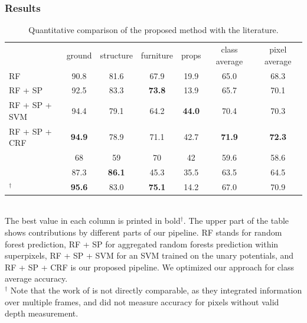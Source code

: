 \documentclass[final,ignorenonframetext,compress]{beamer}
\begin{document}
    \begin{frame}
        \frametitle{Results}
        \begin{table}[t]
            \caption{Quantitative comparison of the proposed method with the
            literature.}
        \begin{tabularx}{\linewidth}{@{\extracolsep{\fill}}lcccccc}
        \toprule
                                & ground        &  structure    & furniture     & props         & class average   & pixel average\\
        \cmidrule(r){1-7}

        RF                              &         90.8  &   81.6        & 67.9          & 19.9          &  65.0        &  68.3 \\
        RF + SP                         &         92.5  &   83.3        & \textbf{73.8} & 13.9          &  65.7        &  70.1 \\ 
        RF + SP + SVM                   &         94.4  &   79.1        & 64.2          & \textbf{44.0} &  70.4        &  70.3 \\
        RF + SP + CRF                   & \textbf{94.9} &   78.9        &          71.1 & 42.7          &\textbf{71.9} &  \textbf{72.3} \\
        \cmidrule(r){1-7}
        \citet{SilbermanECCV12}         &         68    &   59          & 70           & 42            &  59.6        & 58.6 \\
        \citet{couprie-iclr-13}         &         87.3  & \textbf{86.1} & 45.3         & 35.5          &  63.5        & 64.5 \\
        \cmidrule(r){1-7}
        \citet{stueckler2013}$^\dagger$ & \textbf{95.6} &   83.0        & \textbf{75.1}& 14.2          &  67.0        & 70.9 \\

        \bottomrule
        \end{tabularx}
        \quad\\The best value in each column is printed in bold$^\dagger$. The upper part of
        the table shows contributions by different parts of our pipeline. RF stands for random forest prediction, RF + SP for aggregated
        random forests prediction within superpixels, RF + SP + SVM for an SVM trained on the unary potentials, and RF + SP + CRF is
        our proposed pipeline. We optimized our approach for class average
        accuracy.\\
        $^\dagger$ \footnotesize Note that the work of \citet{stueckler2013} is not directly
        comparable, as they integrated information over multiple frames, and did not
        measure accuracy for pixels without valid depth measurement.
        \vspace{-5mm}
        \end{table}
    \end{frame}
\end{document}
